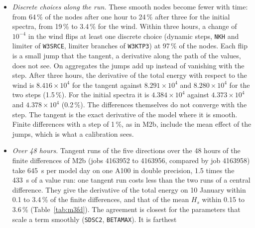 \documentclass[11pt,a4paper]{article}
\begin{document}
\begin{itemize}
carries the tangent through the whole step: forcing, boundary (zero
tangent), ice and level updates, \texttt{W3KTP3}, the geographic
propagation and \texttt{W3SRCE}. Over 3 hours from the restart of
8 January on grid v5 $K=4$, its hourly $H_s$ derivative is compared with
central differences of double-precision runs with relative steps $10^{-4}$
and $10^{-5}$, on the nodes where the two differences agree
(Table~\ref{tab:m3loop}). Without the source terms, the tangent with
respect to the initial spectra agrees with the differences to round-off,
and the total energy to $2\times10^{-9}$ (job 4163934). With them, it
agrees to $10^{-4}$ on all but 7 to 30 of the nodes where the model is
smooth, for the initial spectra and for the wind (jobs 4163935 and
4163936).
\item \emph{Discrete choices along the run.} These smooth nodes become
fewer with time: from 64\,\% of the nodes after one hour to 24\,\% after
three for the initial spectra, from 19\,\% to 3.4\,\% for the wind. Within
three hours, a change of $10^{-4}$ in the wind flips at least one discrete
choice (dynamic steps, \texttt{NKH} and limiter of \texttt{W3SRCE},
limiter branches of \texttt{W3KTP3}) at 97\,\% of the nodes. Each flip
is a small jump that the tangent, a derivative along the path of the
values, does not see. On aggregates the jumps add up instead of vanishing
with the step. After three hours, the derivative of the total energy with
respect to the wind is $8.416\times10^{4}$ for the tangent against
$8.291\times10^{4}$ and $8.280\times10^{4}$ for the two steps
(1.5\,\%). For the initial spectra it is $4.384\times10^{4}$
against $4.373\times10^{4}$ and $4.378\times10^{4}$ (0.2\,\%).
The differences themselves do not converge with the step. The tangent is
the exact derivative of the model where it is smooth. Finite differences
with a step of 1\,\%, as in M2b, include the mean effect of the jumps,
which is what a calibration sees.
\item \emph{Over 48 hours.} Tangent runs of the five directions over the
48 hours of the finite differences of M2b (jobs 4163952 to 4163956,
compared by job 4163958) take \SI{645}{s} per model day on one A100 in
double precision, 1.5 times the \SI{433}{s} of a value run: one tangent
run costs less than the two runs of a central difference. They give the
derivative of the total energy on 10 January within 0.1 to 3.4\,\% of the
finite differences, and that of the mean $H_s$ within 0.15 to 3.6\,\%
(Table~\ref{tab:m3fd}). The agreement is closest for the parameters that
scale a term smoothly (\texttt{SDSC2}, \texttt{BETAMAX}). It is farthest

\end{itemize}
\end{document}
